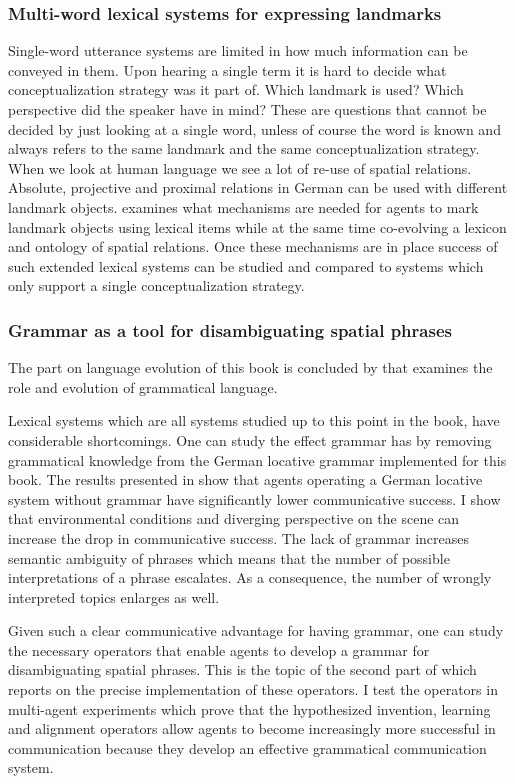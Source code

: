 \subsubsection{Multi-word lexical systems for expressing landmarks}
Single-word utterance systems are limited in how much information can be conveyed
in them. Upon hearing a single term it is hard to decide what conceptualization
strategy was it part of. Which landmark is used? Which perspective
did the speaker have in mind? These are questions that cannot be decided
by just looking at a single word, unless of course the word is known and always
refers to the same landmark and the same conceptualization strategy.
When we look at human language we see a lot of re-use of spatial relations.
Absolute, projective and proximal relations in German can be used with
different landmark objects.  examines what mechanisms
are needed for agents to mark landmark objects using lexical items 
while at the same time co-evolving a lexicon and ontology of spatial relations. 
Once these mechanisms are in place success of such extended lexical systems
can be studied and compared to systems which only support a single
conceptualization strategy.

\subsubsection{Grammar as a tool for disambiguating spatial phrases}
The part on language evolution of this book is concluded by  that examines
the role and evolution of grammatical language. 

Lexical systems which are all systems studied up to this point in the book, 
have considerable shortcomings. One can study the effect grammar has by removing
grammatical knowledge from the German locative grammar implemented for this
book. The results presented in  show that agents operating a 
German locative system without grammar have significantly lower communicative 
success. I show that environmental conditions and diverging perspective on the scene can increase 
the drop in communicative success. The lack of grammar increases semantic
ambiguity of phrases which means that the number of possible interpretations
of a phrase escalates. As a consequence, the number of wrongly interpreted topics enlarges
as well.

Given such a clear communicative advantage for having grammar, one can 
study the necessary operators that enable agents to develop a grammar for 
disambiguating spatial phrases. This is the topic of the second part of 
 which reports on the precise implementation of these operators.
I test the operators in multi-agent experiments which prove that the 
hypothesized invention, learning and alignment operators allow agents 
to become increasingly more successful in communication because 
they develop an effective grammatical communication system.

%
% 
% 
% 